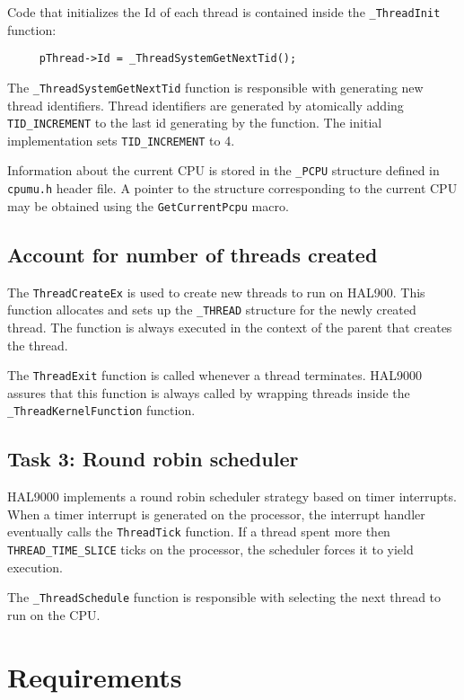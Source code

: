 \documentclass[a4paper,12pt]{report}
\begin{document}
    Code that initializes the Id of each thread is contained inside the \lstinline|_ThreadInit| function:
    \begin{lstlisting}
     pThread->Id = _ThreadSystemGetNextTid();
    \end{lstlisting}
    
    The \lstinline|_ThreadSystemGetNextTid| function is responsible with generating new thread identifiers. Thread identifiers are generated by atomically adding \lstinline{TID_INCREMENT} to the last id generating by the function. The initial implementation sets \lstinline|TID_INCREMENT| to 4. 
    
    Information about the current CPU is stored in the \lstinline|_PCPU| structure defined in \lstinline|cpumu.h| header file. A pointer to the structure corresponding to the current CPU may be obtained using the \lstinline|GetCurrentPcpu| macro. 

\subsection{Account for number of threads created}
    The \lstinline|ThreadCreateEx| is used to create new threads to run on HAL900. This function allocates and sets up the \lstinline|_THREAD| structure for the newly created thread. The function is always executed in the context of the parent that creates the thread. 

    The \lstinline|ThreadExit| function is called whenever a thread terminates. HAL9000 assures that this function is always called by wrapping threads inside the \lstinline|_ThreadKernelFunction| function. 
    
\subsection{Task 3: Round robin scheduler}
    HAL9000 implements a round robin scheduler strategy based on timer interrupts. When a timer interrupt is generated on the processor, the interrupt handler eventually calls the \lstinline|ThreadTick| function. If a thread spent more then \lstinline|THREAD_TIME_SLICE| ticks on the processor, the scheduler forces it to yield execution. 
    
    The \lstinline{_ThreadSchedule} function is responsible with selecting the next thread to run on the CPU. 

\section{Requirements}
\end{document}
